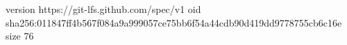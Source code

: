 version https://git-lfs.github.com/spec/v1
oid sha256:011847ff4b567f084a9a999057ce75bb6f54a44cdb90d419dd9778755cb6c16e
size 76
